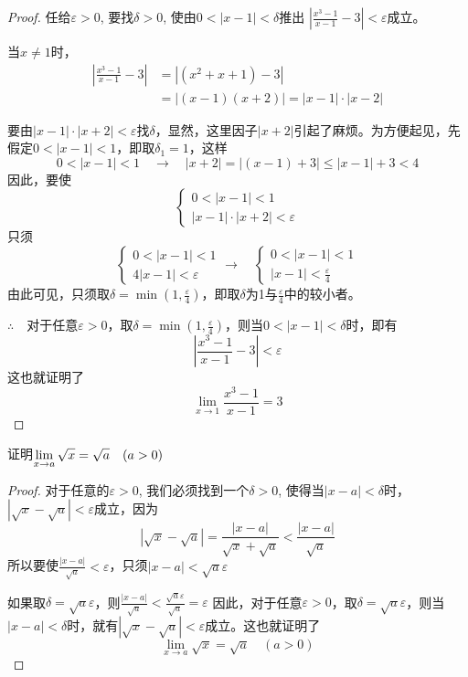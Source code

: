 \begin{proof}
    任给$\varepsilon>0$, 要找$\delta>0$, 使由$0<|x-1|<\delta$推出
    $\left|\frac{x^3-1}{x-1}-3\right|<\varepsilon$成立。

    当$x\ne 1$时，
\[\begin{split}
    \left|\frac{x^3-1}{x-1}-3\right|&=|(x^2+x+1)-3|\\
    &=|(x-1)(x+2)|=|x-1|\cdot |x-2|
\end{split}\]

要由$|x-1|\cdot |x+2|<\varepsilon$找$\delta$，显然，这里因子$|x+2|$引起了麻烦。为方便起见，先假定$0<|x-1|<1$，即取$\delta_1=1$，这样
\[0<|x-1|<1\quad\to \quad |x+2|=|(x-1)+3|\le |x-1|+3<4\]因此，要使
\[\begin{cases}
    0<|x-1|<1\\
    |x-1|\cdot |x+2|<\varepsilon
\end{cases}\]
只须
\[\begin{cases}
    0<|x-1|<1\\
    4|x-1|<\varepsilon
\end{cases}\to \quad \begin{cases}
    0<|x-1|<1\\
    |x-1|<\frac{\varepsilon}{4}
\end{cases}\]
由此可见，只须取$\delta=\min\left(1,\frac{\varepsilon}{4}\right)$，即取$\delta$为1与$\frac{\varepsilon}{4}$中的较小者。

$\therefore\quad $对于任意$\varepsilon>0$，取$\delta=\min\left(1,\frac{\varepsilon}{4}\right)$，则当$0<|x-1|<\delta$时，即有
\[\left|\frac{x^3-1}{x-1}-3\right|<\varepsilon\]
这也就证明了
\[\lim_{x\to 1}\frac{x^3-1}{x-1}=3\]
\end{proof}

\begin{example}
    证明$\displaystyle\lim_{x\to a}\sqrt{x}=\sqrt{a}\quad (a>0)$
\end{example}

\begin{proof}
对于任意的$\varepsilon>0$, 我们必须找到一个$\delta>0$, 使得当$|x-a|<\delta$时，$|\sqrt{x}-\sqrt{a}|<\varepsilon$成立，因为
\[|\sqrt{x}-\sqrt{a}|=\frac{|x-a|}{\sqrt{x}+\sqrt{a}}<\frac{|x-a|}{\sqrt{a}}\]
所以要使$\frac{|x-a|}{\sqrt{a}}<\varepsilon$，只须$|x-a|<\sqrt{a}\varepsilon$

如果取$\delta=\sqrt{a}\varepsilon$，则$\frac{|x-a|}{\sqrt{a}}<\frac{\sqrt{a}\varepsilon}{\sqrt{a}}=\varepsilon$
因此，对于任意$\varepsilon>0$，取$\delta=\sqrt{a}\varepsilon$，则当$|x-a|<\delta$时，就有$|\sqrt{x}-\sqrt{a}|<\varepsilon$成立。这也就证明了
\[\lim_{x\to a}\sqrt{x}=\sqrt{a}\quad (a>0)\]
\end{proof}

